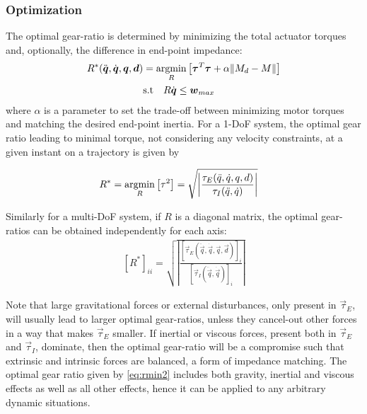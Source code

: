 \subsubsection{Optimization}
 The optimal gear-ratio is determined by minimizing the total actuator torques and, optionally, the difference in end-point impedance:
%
\begin{align}
	R^{*}(\ddot{\vec{q}},\dot{\vec{q}},\vec{q},\vec{d}) &= \operatornamewithlimits{argmin}\limits_{R} \left[ \vec{\tau}^T \vec{\tau} + \alpha \| M_{d} - M \| \right]  \\
	& \text{s.t}  \quad R \dot{\vec{q}} \leq \vec{w}_{max} 
\label{eq:rmin_general}
\end{align}
%
where $\alpha$ is a parameter to set the trade-off between minimizing motor torques and matching the desired end-point inertia.
%
For a 1-DoF system, the optimal gear ratio leading to minimal torque, not considering any velocity constraints, at a given instant on a trajectory is given by

\begin{align}
	R^{*} &= \operatornamewithlimits{argmin}\limits_{R} \left[ \tau^2 \right] = \sqrt{ \left | \frac{\tau_{E}(\ddot{q},\dot{q},q,d)}{\tau_{I}(\ddot{q},\dot{q})} \right |   } 
\label{eq:aaa}
\end{align}

Similarly for a multi-DoF system, if $R$ is a diagonal matrix, the optimal gear-ratios can be obtained independently for each axis:
\begin{align}
	[R^*]_{ii} = \sqrt{ \left | \frac{ [\vec{\tau}_{E}(\ddot{\vec{q}},\dot{\vec{q}},\vec{q},\vec{d})]_i }{ [\vec{\tau}_{I}(\ddot{\vec{q}},\dot{\vec{q}})]_i } \right | }
 \label{eq:rmin2}
\end{align}

Note that large gravitational forces or external disturbances, only present in $\vec{\tau}_{E}$, will usually lead to larger optimal gear-ratios, unless they cancel-out other forces in a way that makes $\vec{\tau}_{E}$ smaller. If inertial or viscous forces, present both in $\vec{\tau}_{E}$ and $\vec{\tau}_{I}$, dominate, then the optimal gear-ratio will be a compromise such that extrinsic and intrinsic forces are balanced, a form of impedance matching. The optimal gear ratio given by \eqref{eq:rmin2} includes both gravity, inertial and viscous effects as well as all other effects, hence it can be applied to any arbitrary dynamic situations.


